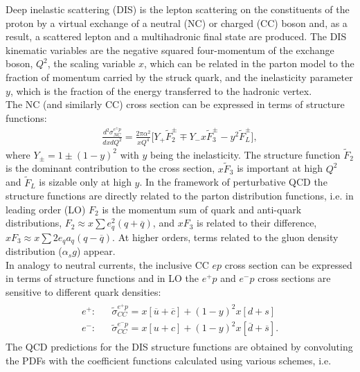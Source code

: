 Deep inelastic scattering (DIS) is the lepton scattering on the 
constituents of the proton by a virtual exchange of a neutral (NC) 
or charged (CC) boson and, as a result, a scattered lepton and a 
multihadronic final state are produced.
The DIS kinematic variables are the negative squared four-momentum of 
the exchange boson, $Q^2$, the 
scaling variable $x$, which can be related in the parton model to 
the fraction of momentum carried by the struck quark, and the 
inelasticity parameter $y$, which is the fraction of the energy 
transferred to the hadronic vertex. 
\\
%
The NC (and similarly CC) cross section can be expressed in terms of structure functions:
\begin{eqnarray}
  \nonumber
   \frac{d^2\sigma_{NC}^{e^{\pm} p}}{dxdQ^2}=\frac{2\pi\alpha^2}{xQ^4} 
     \big [ Y_{+} \tilde F_2^{\pm} \mp Y_{-}x \tilde F_3^{\pm} - y^2 \tilde F_L^{\pm} \big ],
\end{eqnarray}
where $Y_{\pm} = 1 \pm (1-y)^2$ with $y$ being the inelasticity. The structure function $\tilde F_2$
is the dominant contribution to the cross section, $x \tilde F_3$ is important at high $Q^2$ and $\tilde F_L$ is sizable 
only at high $y$. 
In the framework of perturbative QCD the structure functions are directly related to the 
parton distribution functions, i.e. in leading order (LO)  $F_2$ is the momentum sum of quark and anti-quark distributions, 
$F_2 \approx x \sum e^2_q (q+ \overline q)$, and $xF_3$ is related to their difference, 
    $xF_3 \approx x \sum 2e_q a_q (q- \overline q)$. At higher orders, terms related to the gluon density distribution
($\alpha_s g$) appear.
\\
In analogy to neutral currents, the inclusive CC $ep$ cross section can be expressed 
in terms of structure functions and in LO the $e^+p$ and $e^-p$ cross sections are sensitive to different quark 
densities:
\begin{eqnarray}
  \nonumber
    \begin{array}{rll}
   e^{+}:  & & \tilde \sigma_{CC}^{e^{+} p} = 
                x[\overline u +\overline c] + (1-y)^2 x[ d+s ]  \\
   e^{-}:  & & \tilde \sigma_{CC}^{e^{-} p} = 
                x[ u +c] + (1-y)^2 x[\overline d +\overline s ].
    \end{array}
\end{eqnarray}
%
The QCD predictions for the DIS structure functions are obtained by convoluting 
the PDFs with the coefficient functions calculated using various schemes, i.e.
